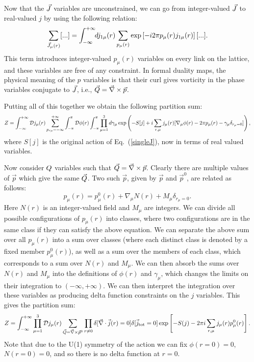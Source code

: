  Now that the $\vec{J}$ variables are unconstrained, we can go from integer-valued $\vec{J}$ to real-valued $j$ by using the following relation:
\begin{equation*}
\sum_{\vec{J}_{\mu}(r)}[...]=\int_{-\infty}^{+\infty}\!\! dj_{1\mu}(r) \sum_{p_{\mu}(r)} \exp\left[-i2\pi p_{\mu}(r)j_{1\mu}(r)\right][...].
\end{equation*} 
This term introduces integer-valued $p_{\mu}(r)$ variables on every link on the lattice, and these variables are free of any constraint.  In formal duality maps,\cite{PolyakovBook, Peskin1978, Dasgupta1981, FisherLee1989, LeeFisher1989, artphoton, short_range3} the physical meaning of the $p$ variables is that their curl gives vorticity in the phase variables conjugate to $\vec{J}$, i.e., ${\vec{Q}} = \vec{\nabla} \times \vec{p}$.

Putting all of this together we obtain the following partition sum:
\begin{equation}
Z=\int_{-\infty}^{+\infty}{\cal D}j_{\mu}(r) \sum_{p_{r\mu}=-\infty}^{+\infty}\int_{-\pi}^{\pi} {\cal D}\phi(r) \int_{-\pi}^{\pi} \prod_{\mu=1}^{3} d\gamma_{\mu} 
\exp\left(-S[j]+ i \sum_{r,\mu} j_\mu(r)[\nabla_\mu\phi(r) - 2\pi p_\mu(r)- \gamma_\mu \delta_{r_\mu=0}]\right),
\label{duality_mid}
\end{equation}
where $S[j]$ is the original action of Eq.~(\ref{singleJ}), now in terms of real valued variables. 

Now consider $Q$ variables such that $\vec{Q}=\vec{\nabla}\times\vec{p}$. Clearly there are multiple values of $\vec{p}$ which give the same $\vec{Q}$. Two such $\vec{p}$, given by $\vec{p}$ and $\vec{p}^0$, are related as follows:
\begin{equation}
p_\mu(r)=p^0_\mu(r)+\nabla_\mu N(r)+M_\mu \delta_{r_\mu=0}.
\end{equation}
Here $N(r)$ is an integer-valued field and $M_\mu$ are integers. We can divide all possible configurations of $p_\mu(r)$ into classes, where two configurations are in the same class if they can satisfy the above equation. We can separate the above sum over all $p_\mu(r)$ into a sum over classes (where each distinct class is denoted by a fixed member $p_\mu^0(r)$), as well as a sum over the members of each class, which corresponds to a sum over $N(r)$ and $M_\mu$. We can then absorb the sums over $N(r)$ and $M_\mu$ into the definitions of $\phi(r)$ and $\gamma_\mu$, which changes the limits on their integration to $(-\infty,+\infty)$. We can then interpret the integration over these variables as producing delta function constraints on the $j$ variables. This gives the partition sum:
\begin{equation}
Z=\int_{-\infty}^{+\infty}\prod_{\mu=1}^{3}{\cal D}j_{\mu}(r)\sum_{\vec{Q}=\vec{\nabla}\times \vec{p}^0} \prod_{r\neq0} \delta[\vec{\nabla}\cdot\vec{j}(r)=0]\delta[\vec{j}_{\rm tot}=0]  
\exp\left[-S(j)- 2\pi i \sum_{r,\mu} j_\mu(r) p^0_\mu(r)\right].
\label{Z3}
\end{equation}
Note that due to the U(1) symmetry of the action we can fix $\phi(r=0)=0$, $N(r=0)=0$, and so there is no delta function at $r=0$. 

